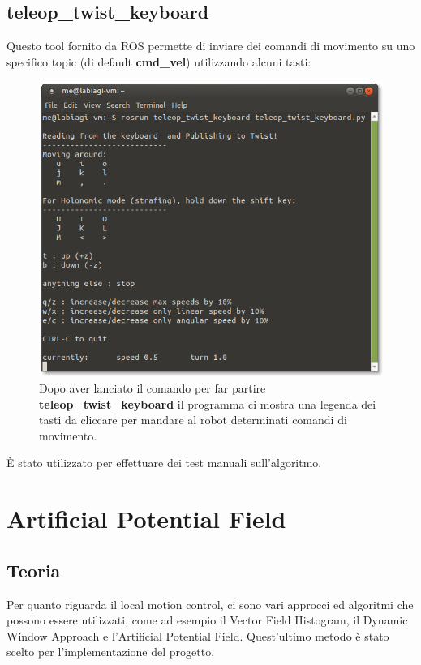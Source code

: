 \documentclass[Lau, binding=0.6cm, oneside]{sapthesis}
\begin{document}
\subsection{teleop\_twist\_keyboard}
Questo tool fornito da ROS permette di inviare dei comandi di movimento su uno specifico topic (di default \textbf{cmd\_vel}) utilizzando alcuni tasti:
\begin{figure}[H]
    \centering
    \includegraphics[width=13cm]{teleop.png}
    \caption{Dopo aver lanciato il comando per far partire \textbf{teleop\_twist\_keyboard} il programma ci mostra una legenda dei tasti da cliccare per mandare al robot determinati comandi di movimento.}
    \label{fig:teleop}
\end{figure}
È stato utilizzato per effettuare dei test manuali sull'algoritmo.

\section{Artificial Potential Field}
\subsection{Teoria}
Per quanto riguarda il local motion control, ci sono vari approcci ed algoritmi che possono essere utilizzati, come ad esempio il Vector Field Histogram, il Dynamic Window Approach e l'Artificial Potential Field\cite{fonte1}.
Quest'ultimo metodo è stato scelto per l'implementazione del progetto.
\end{document}
